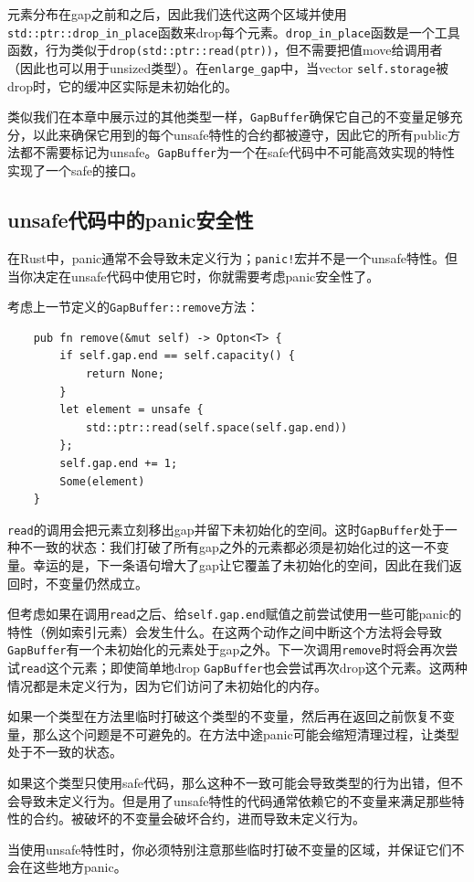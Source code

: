 元素分布在gap之前和之后，因此我们迭代这两个区域并使用\texttt{std::ptr::drop\_in\_place}函数来drop每个元素。\texttt{drop\_in\_place}函数是一个工具函数，行为类似于\texttt{drop(std::ptr::read(ptr))}，但不需要把值move给调用者（因此也可以用于unsized类型）。在\texttt{enlarge\_gap}中，当vector \texttt{self.storage}被drop时，它的缓冲区实际是未初始化的。

类似我们在本章中展示过的其他类型一样，\texttt{GapBuffer}确保它自己的不变量足够充分，以此来确保它用到的每个unsafe特性的合约都被遵守，因此它的所有public方法都不需要标记为unsafe。\texttt{GapBuffer}为一个在safe代码中不可能高效实现的特性实现了一个safe的接口。

\subsection{unsafe代码中的panic安全性}
在Rust中，panic通常不会导致未定义行为；\texttt{panic!}宏并不是一个unsafe特性。但当你决定在unsafe代码中使用它时，你就需要考虑panic安全性了。

考虑上一节定义的\texttt{GapBuffer::remove}方法：
\begin{verbatim}
    pub fn remove(&mut self) -> Opton<T> {
        if self.gap.end == self.capacity() {
            return None;
        }
        let element = unsafe {
            std::ptr::read(self.space(self.gap.end))
        };
        self.gap.end += 1;
        Some(element)
    }
\end{verbatim}

\texttt{read}的调用会把元素立刻移出gap并留下未初始化的空间。这时\texttt{GapBuffer}处于一种不一致的状态：我们打破了所有gap之外的元素都必须是初始化过的这一不变量。幸运的是，下一条语句增大了gap让它覆盖了未初始化的空间，因此在我们返回时，不变量仍然成立。

但考虑如果在调用\texttt{read}之后、给\texttt{self.gap.end}赋值之前尝试使用一些可能panic的特性（例如索引元素）会发生什么。在这两个动作之间中断这个方法将会导致\texttt{GapBuffer}有一个未初始化的元素处于gap之外。下一次调用\texttt{remove}时将会再次尝试\texttt{read}这个元素；即使简单地drop \texttt{GapBuffer}也会尝试再次drop这个元素。这两种情况都是未定义行为，因为它们访问了未初始化的内存。

如果一个类型在方法里临时打破这个类型的不变量，然后再在返回之前恢复不变量，那么这个问题是不可避免的。在方法中途panic可能会缩短清理过程，让类型处于不一致的状态。

如果这个类型只使用safe代码，那么这种不一致可能会导致类型的行为出错，但不会导致未定义行为。但是用了unsafe特性的代码通常依赖它的不变量来满足那些特性的合约。被破坏的不变量会破坏合约，进而导致未定义行为。

当使用unsafe特性时，你必须特别注意那些临时打破不变量的区域，并保证它们不会在这些地方panic。


